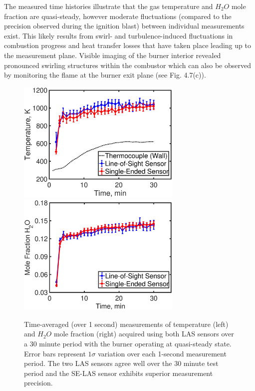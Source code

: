 \noindent The measured time histories illustrate that the gas temperature and $H_2O$ mole fraction are quasi-steady, however moderate fluctuations (compared to the precision observed during the ignition blast) between individual measurements exist. This likely results from swirl- and turbulence-induced fluctuations in combustion progress and heat transfer losses that have taken place leading up to the measurement plane. Visible imaging of the burner interior revealed pronounced swirling structures within the combustor which can also be observed by monitoring the flame at the burner exit plane (see Fig. 4.7(c)).

\begin{figure} \centering 
\includegraphics[width=0.7\textwidth]{fig/ch4_fig10_2.eps}  
\includegraphics[width=0.7\textwidth]{fig/ch4_fig10_1.eps}  
\caption{Time-averaged (over 1 second) measurements of temperature (left) and $H_2O$ mole fraction (right) acquired using both LAS sensors over a 30 minute period with the burner operating at quasi-steady state. Error bars represent $1\sigma$ variation over each 1-second measurement period. The two LAS sensors agree well over the 30 minute test period and the SE-LAS sensor exhibits superior measurement precision.}
    \label{fig:ch4_10}
\end{figure}


